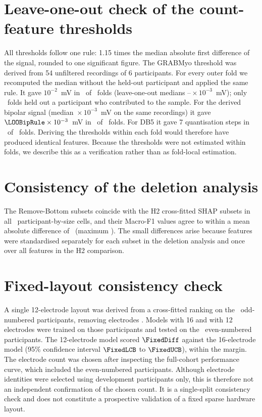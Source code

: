 \documentclass{iopjournal}
\newif\ifshowchanges
\newcommand{\chg}[1]{\ifshowchanges{\color{blue}#1}\else{#1}\fi}
\begin{document}
\section{Leave-one-out check of the count-feature thresholds}
\label{app:threshold}
All thresholds follow one rule: 1.15 times the median absolute first difference of the signal, rounded to one significant figure. The GRABMyo threshold was derived from 54 unfiltered recordings of 6 participants. For every outer fold we recomputed the median without the held-out participant and applied the same rule. It gave $10^{-2}$~mV in \LOOMonoIdentical\ of \LOOMonoFolds\ folds (leave-one-out medians \LOOMonoMin--\LOOMonoMax${}\times 10^{-3}$~mV); only \LOOMonoInProbe\ folds held out a participant who contributed to the sample. For the derived bipolar signal (median \LOOBipPooled${}\times 10^{-3}$~mV on the same recordings) it gave $\LOOBipRule \times 10^{-3}$~mV in \LOOBipIdentical\ of \LOOBipFolds\ folds. For DB5 it gave 7 quantisation steps in \LOODBFiveIdentical\ of \LOODBFiveFolds\ folds. Deriving the thresholds within each fold would therefore have produced identical features. Because the thresholds were not estimated within folds, we describe this as a verification rather than as fold-local estimation.

\section{Consistency of the deletion analysis}
\label{app:faith}
The Remove-Bottom subsets coincide with the H2 cross-fitted SHAP subsets in all \FaithProtocolCells\ participant-by-size cells, and their Macro-F1 values agree to within a mean absolute difference of \FaithProtocolMeanDiff\ (maximum \FaithProtocolMaxDiff). The small differences arise because features were standardised separately for each subset in the deletion analysis and once over all features in the H2 comparison.

\section{Fixed-layout consistency check}
\label{app:fixed}
A single 12-electrode layout was derived from a cross-fitted ranking on the \FixedDev\ odd-numbered participants, removing electrodes \FixedDropped. Models with 16 and with 12 electrodes were trained on those participants and tested on the \FixedTest\ even-numbered participants. The 12-electrode model scored $\FixedDiff$ against the 16-electrode model (95\% confidence interval $\FixedLCB$ to $\FixedUCB$), within the margin. The electrode count was chosen after inspecting the full-cohort performance curve, which included the even-numbered participants. Although electrode identities were selected using development participants only, this is therefore not an independent confirmation of the chosen count. It is a single-split consistency check \chg{and does not constitute a prospective validation of a fixed sparse hardware layout.}
\end{document}
